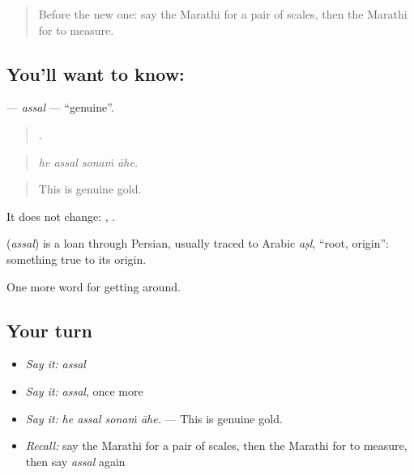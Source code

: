 \label{lesson:MR-C425-assal}



\begin{quote}
Before the new one: say the Marathi for a pair of scales, then the Marathi for to measure.
\end{quote}

\subsection*{You'll want to know: }
\textbf{} — \emph{assal} — \textquotedblleft{}genuine\textquotedblright{}.

\begin{quote}
   .
\end{quote}

\begin{quote}
\emph{he assal sonaṁ āhe.}
\end{quote}

\begin{quote}
This is genuine gold.
\end{quote}

It does not change:  ,  .

\begin{cousinweb}
\textbf{} (\emph{assal}) is a loan through Persian, usually traced to Arabic \emph{aṣl}, \textquotedblleft{}root, origin\textquotedblright{}: something true to its origin.
\end{cousinweb}

\begin{grammarlens}[title={What you've built}]
One more word for getting around.
\end{grammarlens}

\subsection*{Your turn}
\begin{itemize}
\raggedright
  \item \emph{Say it:} \emph{assal}
  \item \emph{Say it:} \emph{assal}, once more
  \item \emph{Say it:} \emph{he assal sonaṁ āhe.} — This is genuine gold.
  \item \emph{Recall:} say the Marathi for a pair of scales, then the Marathi for to measure, then say \emph{assal} again
\end{itemize}


